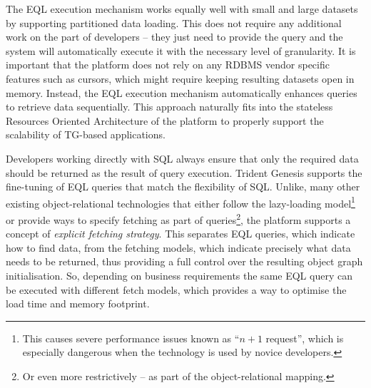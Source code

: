

  The EQL execution mechanism works equally well with small and large datasets by supporting partitioned data loading.
  This does not require any additional work on the part of developers -- they just need to provide the query and the system will automatically execute it with the necessary level of granularity.
  It is important that the platform does not rely on any RDBMS vendor specific features such as cursors, which might require keeping resulting datasets open in memory.
  Instead, the EQL execution mechanism automatically enhances queries to retrieve data sequentially.
  This approach naturally fits into the stateless Resources Oriented Architecture of the platform to properly support the scalability of TG-based applications.

  Developers working directly with SQL always ensure that only the required data should be returned as the result of query execution.  
  Trident Genesis supports the fine-tuning of EQL queries that match the flexibility of SQL.
  Unlike, many other existing object-relational technologies that either follow the lazy-loading model\footnote{
  This causes severe performance issues known as ``$n+1$ request'', which is especially dangerous when the technology is used by novice developers.}
  or provide ways to specify fetching as part of queries\footnote{Or even more restrictively -- as part of the object-relational mapping.}, the platform supports a concept of \emph{explicit fetching strategy}.
  This separates EQL queries, which indicate how to find data, from the fetching models, which indicate precisely what data needs to be returned, thus providing a full control over the resulting object graph initialisation.
  So, depending on business requirements the same EQL query can be executed with different fetch models, which provides a way to optimise the load time and memory footprint.

